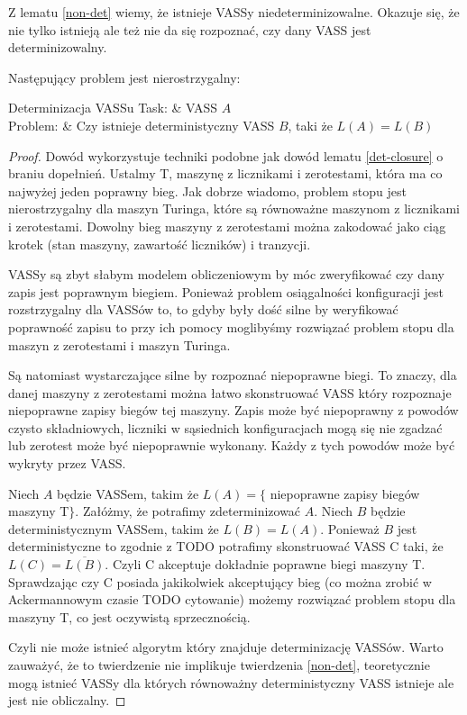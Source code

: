    Z lematu \ref{non-det} wiemy, że istnieje VASSy niedeterminizowalne.
    Okazuje się, że nie tylko istnieją ale też nie da się rozpoznać, czy dany VASS jest determinizowalny.

    \begin{theorem}
        Następujący problem jest nierostrzygalny:
        \begin{problem}[]{Determinizacja VASSu}
            Task: & VASS $A$\\
            Problem: & Czy istnieje deterministyczny VASS $B$, taki że $L(A) = L(B)$\\
        \end{problem}


    \end{theorem}

    \begin{proof}
        Dowód wykorzystuje techniki podobne jak dowód lematu \ref{det-closure} o braniu dopełnień.
        Ustalmy T, maszynę z licznikami i zerotestami, która ma co najwyżej jeden poprawny bieg.
        Jak dobrze wiadomo, problem stopu jest nierostrzygalny dla maszyn Turinga, które są równoważne maszynom z licznikami i zerotestami.
        Dowolny bieg maszyny z zerotestami można zakodować jako ciąg krotek (stan maszyny, zawartość liczników) i tranzycji.

        VASSy są zbyt słabym modelem obliczeniowym by móc zweryfikować czy dany zapis jest poprawnym biegiem.
        Ponieważ problem osiągalności konfiguracji jest rozstrzygalny dla VASSów to, to gdyby były dość silne
        by weryfikować poprawność zapisu to przy ich pomocy moglibyśmy rozwiązać problem stopu dla maszyn z zerotestami i maszyn Turinga.

        Są natomiast wystarczające silne by rozpoznać niepoprawne biegi.
        To znaczy, dla danej maszyny z zerotestami można łatwo skonstruować VASS który rozpoznaje niepoprawne zapisy biegów
        tej maszyny.
        Zapis może być niepoprawny z powodów czysto składniowych, liczniki w sąsiednich konfiguracjach mogą się nie zgadzać
        lub zerotest może być niepoprawnie wykonany.
        Każdy z tych powodów może być wykryty przez VASS.


        Niech $A$ będzie VASSem, takim że $L(A)=\{$ niepoprawne zapisy biegów maszyny T$\}$.
        Załóżmy, że potrafimy zdeterminizować $A$.
        Niech $B$ będzie deterministycznym VASSem, takim że $L(B)=L(A)$.
        Ponieważ $B$ jest deterministyczne to zgodnie z TODO potrafimy skonstruować VASS C taki, że $L(C) = \overline{L(B)}$.
        Czyli C akceptuje dokładnie poprawne biegi maszyny T.
        Sprawdzając czy C posiada jakikolwiek akceptujący bieg (co można zrobić w Ackermannowym czasie TODO cytowanie)
        możemy rozwiązać problem stopu dla maszyny T, co jest oczywistą sprzecznością.

        Czyli nie może istnieć algorytm który znajduje determinizację VASSów.
        Warto zauważyć, że to twierdzenie nie implikuje twierdzenia  \ref{non-det}, teoretycznie mogą istnieć VASSy dla których
        równoważny deterministyczny VASS istnieje ale jest nie obliczalny.
    \end{proof}

